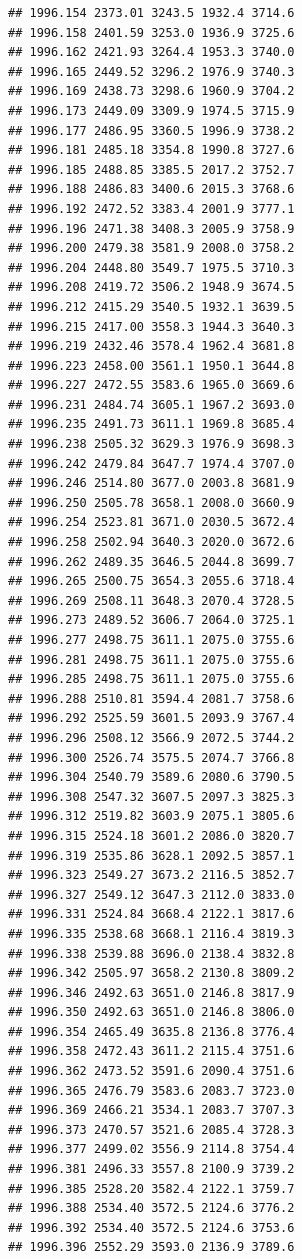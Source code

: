 \documentclass[
]{book}
\begin{document}
\begin{verbatim}
## 1996.154 2373.01 3243.5 1932.4 3714.6
## 1996.158 2401.59 3253.0 1936.9 3725.6
## 1996.162 2421.93 3264.4 1953.3 3740.0
## 1996.165 2449.52 3296.2 1976.9 3740.3
## 1996.169 2438.73 3298.6 1960.9 3704.2
## 1996.173 2449.09 3309.9 1974.5 3715.9
## 1996.177 2486.95 3360.5 1996.9 3738.2
## 1996.181 2485.18 3354.8 1990.8 3727.6
## 1996.185 2488.85 3385.5 2017.2 3752.7
## 1996.188 2486.83 3400.6 2015.3 3768.6
## 1996.192 2472.52 3383.4 2001.9 3777.1
## 1996.196 2471.38 3408.3 2005.9 3758.9
## 1996.200 2479.38 3581.9 2008.0 3758.2
## 1996.204 2448.80 3549.7 1975.5 3710.3
## 1996.208 2419.72 3506.2 1948.9 3674.5
## 1996.212 2415.29 3540.5 1932.1 3639.5
## 1996.215 2417.00 3558.3 1944.3 3640.3
## 1996.219 2432.46 3578.4 1962.4 3681.8
## 1996.223 2458.00 3561.1 1950.1 3644.8
## 1996.227 2472.55 3583.6 1965.0 3669.6
## 1996.231 2484.74 3605.1 1967.2 3693.0
## 1996.235 2491.73 3611.1 1969.8 3685.4
## 1996.238 2505.32 3629.3 1976.9 3698.3
## 1996.242 2479.84 3647.7 1974.4 3707.0
## 1996.246 2514.80 3677.0 2003.8 3681.9
## 1996.250 2505.78 3658.1 2008.0 3660.9
## 1996.254 2523.81 3671.0 2030.5 3672.4
## 1996.258 2502.94 3640.3 2020.0 3672.6
## 1996.262 2489.35 3646.5 2044.8 3699.7
## 1996.265 2500.75 3654.3 2055.6 3718.4
## 1996.269 2508.11 3648.3 2070.4 3728.5
## 1996.273 2489.52 3606.7 2064.0 3725.1
## 1996.277 2498.75 3611.1 2075.0 3755.6
## 1996.281 2498.75 3611.1 2075.0 3755.6
## 1996.285 2498.75 3611.1 2075.0 3755.6
## 1996.288 2510.81 3594.4 2081.7 3758.6
## 1996.292 2525.59 3601.5 2093.9 3767.4
## 1996.296 2508.12 3566.9 2072.5 3744.2
## 1996.300 2526.74 3575.5 2074.7 3766.8
## 1996.304 2540.79 3589.6 2080.6 3790.5
## 1996.308 2547.32 3607.5 2097.3 3825.3
## 1996.312 2519.82 3603.9 2075.1 3805.6
## 1996.315 2524.18 3601.2 2086.0 3820.7
## 1996.319 2535.86 3628.1 2092.5 3857.1
## 1996.323 2549.27 3673.2 2116.5 3852.7
## 1996.327 2549.12 3647.3 2112.0 3833.0
## 1996.331 2524.84 3668.4 2122.1 3817.6
## 1996.335 2538.68 3668.1 2116.4 3819.3
## 1996.338 2539.88 3696.0 2138.4 3832.8
## 1996.342 2505.97 3658.2 2130.8 3809.2
## 1996.346 2492.63 3651.0 2146.8 3817.9
## 1996.350 2492.63 3651.0 2146.8 3806.0
## 1996.354 2465.49 3635.8 2136.8 3776.4
## 1996.358 2472.43 3611.2 2115.4 3751.6
## 1996.362 2473.52 3591.6 2090.4 3751.6
## 1996.365 2476.79 3583.6 2083.7 3723.0
## 1996.369 2466.21 3534.1 2083.7 3707.3
## 1996.373 2470.57 3521.6 2085.4 3728.3
## 1996.377 2499.02 3556.9 2114.8 3754.4
## 1996.381 2496.33 3557.8 2100.9 3739.2
## 1996.385 2528.20 3582.4 2122.1 3759.7
## 1996.388 2534.40 3572.5 2124.6 3776.2
## 1996.392 2534.40 3572.5 2124.6 3753.6
## 1996.396 2552.29 3593.0 2136.9 3789.6

\end{verbatim}
\end{document}
